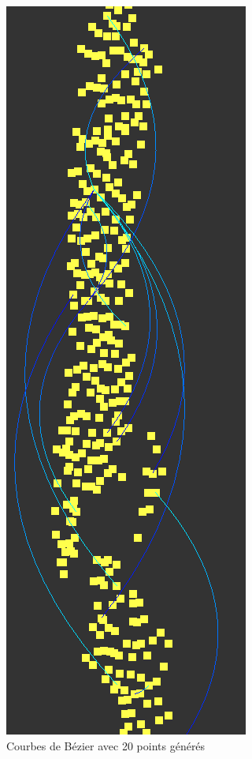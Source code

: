 \documentclass[12pt]{article}
\begin{document}
		\begin{figure}[!h]
		\begin{center}
		\includegraphics[scale=.60]{20_generated_points.png}
		\caption{Courbes de Bézier avec 20 points générés}
		\end{center}
		\end{figure}
		
\end{document}
